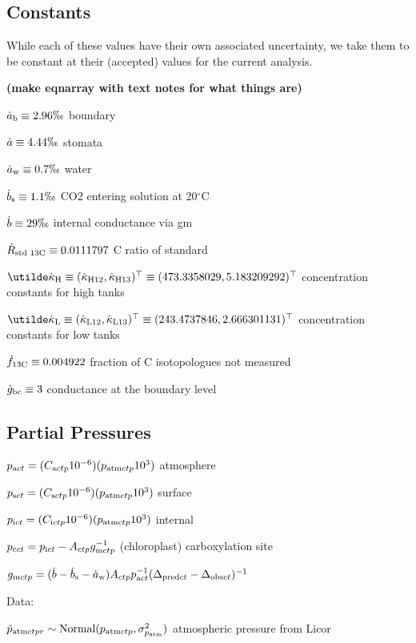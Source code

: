 \documentclass[12pt]{article}
\begin{document}
\subsection{Constants}

While each of these values have their own associated uncertainty,
  we take them to be constant at their (accepted) values for the current analysis.

{\bf (make eqnarray with text notes for what things are)}

$\sdotab\equiv 2.96 \permil   $ boundary

$\sdota\equiv 4.44 \permil    $ stomata

$\sdotaw\equiv 0.7 \permil    $ water

$\sdotbs\equiv 1.1 \permil    $ CO2 entering solution at 20$^\circ$C

$\sdotb\equiv 29 \permil      $ internal conductance via gm

$\dot{R}_\textrm{std 13C}\equiv 0.0111797    $ C ratio of standard

$\vdotkappaHtw
  \equiv (\sdotkappaHtw, \sdotkappaHth)^\transpose
  \equiv (473.3358029, 5.183209292)^\transpose      $ concentration constants for high tanks

$\vdotkappaLtw
  \equiv (\sdotkappaLtw, \sdotkappaLth)^\transpose
  \equiv (243.4737846, 2.666301131)^\transpose      $ concentration constants for low  tanks

$\dot{f}_{\textrm{13C}}\equiv 0.004922     $ fraction of C isotopologues not measured

$\dot{g}_{\textrm{bc}}\equiv 3$  conductance at the boundary level



\subsection{Partial Pressures}

$p_{\textrm{a}ct} = (C_{\textrm{a}ctp} 10^{-6})(p_{\textrm{atm}ctp} 10^3)$ atmosphere

$p_{\textrm{s}ct} = (C_{\textrm{s}ctp} 10^{-6})(p_{\textrm{atm}ctp} 10^3)$ surface

$p_{\textrm{i}ct} = (C_{\textrm{i}ctp} 10^{-6})(p_{\textrm{atm}ctp} 10^3)$ internal

$p_{\textrm{c}ct} = p_{\textrm{i}ct} - A_{ctp} g_{\textrm{m}ctp}^{-1}$ (chloroplast) carboxylation site

$g_{\textrm{m}ctp} = (\dot{b} - \dot{b}_{\textrm{s}} - \dot{a}_{\textrm{w}})A_{ctp}p_{\textrm{a}ct}^{-1}(\Delta_{\textrm{pred}ct}-\Delta_{\textrm{obs}ct})^{-1}$

Data:

$\tilde{p}_{\textrm{atm}ctpr} \sim \textrm{Normal}(p_{\textrm{atm}ctp},\sigma_{p_{\textrm{atm}}}^2)$ atmospheric pressure from Licor
\end{document}
